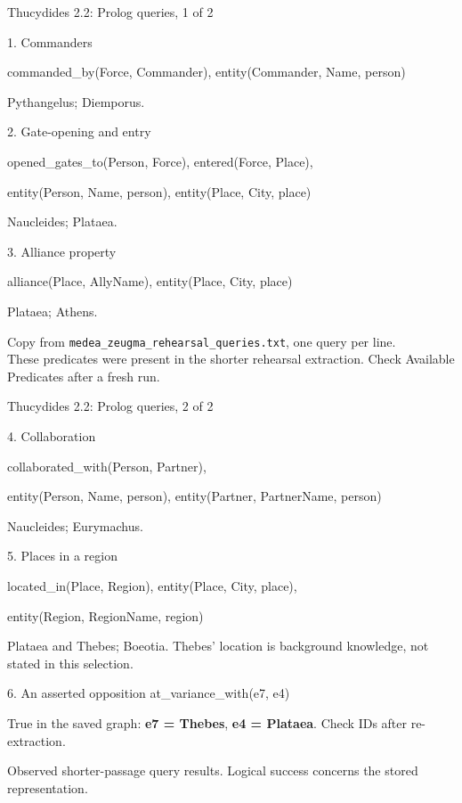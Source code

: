 \documentclass[aspectratio=169,10pt]{beamer}
\newcommand{\source}[1]{\vfill{\scriptsize\color{slate}#1\par}}
\begin{document}
\begin{frame}{Thucydides 2.2: Prolog queries, 1 of 2}
  \begin{block}{1. Commanders}
    \small\ttfamily\raggedright\setlength{\parskip}{0pt}
    commanded\_by(Force, Commander), entity(Commander, Name, person)
  \end{block}
  \small Pythangelus; Diemporus.
  \begin{block}{2. Gate-opening and entry}
    \small\ttfamily\raggedright\setlength{\parskip}{0pt}
    opened\_gates\_to(Person, Force), entered(Force, Place),\par
    entity(Person, Name, person), entity(Place, City, place)
  \end{block}
  \small Naucleides; Plataea.
  \begin{block}{3. Alliance property}
    \small\ttfamily\raggedright\setlength{\parskip}{0pt}
    alliance(Place, AllyName), entity(Place, City, place)
  \end{block}
  \small Plataea; Athens.
  \source{Copy from \texttt{medea\_zeugma\_rehearsal\_queries.txt}, one query per line.\\
  These predicates were present in the shorter rehearsal extraction. Check Available Predicates after a fresh run.}
\end{frame}

\begin{frame}{Thucydides 2.2: Prolog queries, 2 of 2}
  \begin{block}{4. Collaboration}
    \small\ttfamily\raggedright\setlength{\parskip}{0pt}
    collaborated\_with(Person, Partner),\par
    entity(Person, Name, person), entity(Partner, PartnerName, person)
  \end{block}
  \small Naucleides; Eurymachus.
  \begin{block}{5. Places in a region}
    \small\ttfamily\raggedright\setlength{\parskip}{0pt}
    located\_in(Place, Region), entity(Place, City, place),\par
    entity(Region, RegionName, region)
  \end{block}
  \small Plataea and Thebes; Boeotia. Thebes' location is background knowledge, not stated in this selection.
  \begin{block}{6. An asserted opposition}
    \small\ttfamily at\_variance\_with(e7, e4)
  \end{block}
  \small True in the saved graph: \textbf{e7 = Thebes}, \textbf{e4 = Plataea}. Check IDs after re-extraction.
  \source{Observed shorter-passage query results. Logical success concerns the stored representation.}
\end{frame}
\end{document}
